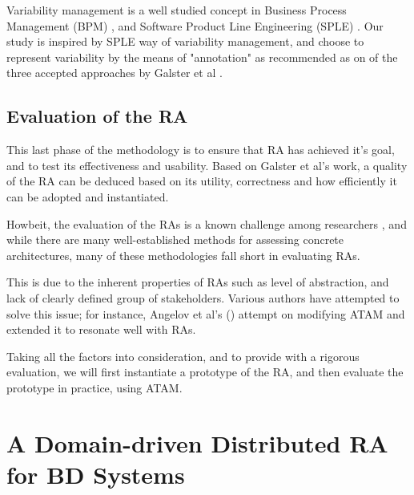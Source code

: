 \documentclass[runningheads]{llncs}
\begin{document}

Variability management is a well studied concept in Business Process Management (BPM) \cite{la2009questionnaire}, and Software Product Line Engineering (SPLE) \cite{pohl2005software}. Our study is inspired by SPLE way of variability management, and choose to represent variability by the means of "annotation" as recommended as on of the three accepted approaches by Galster et al \cite{GALSTER}.


\subsection{Evaluation of the RA}

This last phase of the methodology is to ensure that RA has achieved it's goal, and to test its effectiveness and usability. Based on Galster et al's work, a quality of the RA can be deduced based on its utility, correctness and how efficiently it can be adopted and instantiated.  

Howbeit, the evaluation of the RAs is a known challenge among researchers \cite{Avgeriou}, and while there are many well-established methods for assessing concrete architectures, many of these methodologies fall short in evaluating RAs. 

This is due to the inherent properties of RAs such as level of abstraction, and lack of clearly defined group of stakeholders. Various authors have attempted to solve this issue; for instance, Angelov et al's (\cite{angelov2008towards}) attempt on modifying ATAM and extended it to resonate well with RAs. 



Taking all the factors into consideration, and to provide with a rigorous evaluation, we will first instantiate a prototype of the RA, and then evaluate the prototype in practice, using ATAM. 

\section{A Domain-driven Distributed RA for BD Systems}
\end{document}
